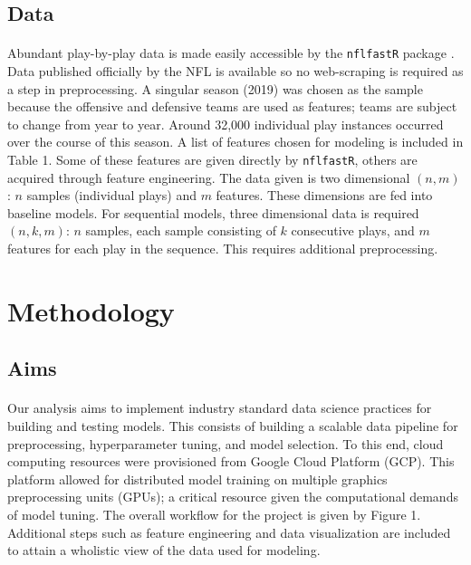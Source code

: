 \documentclass[11pt]{article}
\begin{document}
    \begin{multicols*}{2}
        \subsection{Data}
            \paragraph{}
                Abundant play-by-play data is made easily accessible by the \texttt{nflfastR} package \cite{Carl22}. 
                Data published officially by the NFL is available so no web-scraping is required as a step in preprocessing.
                A singular season (2019) was chosen as the sample because the offensive and defensive teams are used as features; teams are subject to change from year to year. 
                Around 32,000 individual play instances occurred over the course of this season.  
                A list of features chosen for modeling is included in Table 1. 
                Some of these features are given directly by \texttt{nflfastR}, others are acquired through feature engineering.
                The data given is two dimensional $(n,m)$: $n$ samples (individual plays) and $m$ features. 
                These dimensions are fed into baseline models.
                For sequential models, three dimensional data is required $(n,k,m)$: $n$ samples, each sample consisting of $k$ consecutive plays, and $m$ features for each play in the sequence. 
                This requires additional preprocessing.

    \section{Methodology}

        \subsection{Aims}
            \paragraph{}
                Our analysis aims to implement industry standard data science practices for building and testing models.
                This consists of building a scalable data pipeline for preprocessing, hyperparameter tuning, and model selection.
                To this end, cloud computing resources were provisioned from Google Cloud Platform (GCP). 
                This platform allowed for distributed model training on multiple graphics preprocessing units (GPUs); a critical resource given the computational demands of model tuning.  
                The overall workflow for the project is given by Figure 1. 
                Additional steps such as feature engineering and data visualization are included to attain a wholistic view of the data used for modeling.
    
        \end{multicols*}
\end{document}
